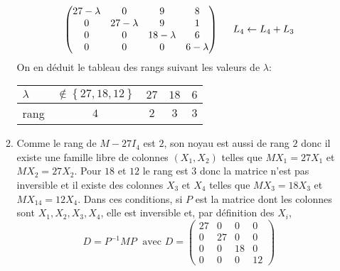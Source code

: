 \begin{enumerate}
\begin{enumerate}
\begin{multline*}
\begin{pmatrix}
27 - \lambda & 0 & 9 & 8 \\ 0 & 27 - \lambda  & 9 & 1 \\
0 & 0 & 18 - \lambda & 6 \\ 0 & 0 & 0 & 6 - \lambda
\end{pmatrix}
\hspace{0.5cm} L_4 \leftarrow L_4 + L_3  \\
\end{multline*}
On en déduit le tableau des rangs suivant les valeurs de $\lambda$:
\begin{center}
\renewcommand{\arraystretch}{1.8}
\begin{tabular}{|l|c|c|c|c|} \hline
$\lambda$ & $\notin \left\lbrace 27, 18, 12\right\rbrace $ & $27$ & $18$ & $6$\\\hline
rang & $4$ & $2$ & $3$ & $3$ \\ \hline
\end{tabular}
\end{center}

  \item Comme le rang de $M-27 I_4$ est $2$, son noyau est aussi de rang $2$ donc il existe une famille libre de colonnes $(X_1,X_2)$ telles que $MX_1 = 27X_1$ et $MX_2=27X_2$. Pour $18$ et $12$ le rang est $3$ donc la matrice n'est pas inversible et il existe des colonnes $X_3$ et $X_4$ telles que $MX_3=18X_3$ et $MX_14=12X_4$.\newline
  Dans ces conditions, si $P$ est la matrice dont les colonnes sont $X_1,X_2,X_3,X_4$, elle est inversible et, par définition des $X_i$, 
  \begin{displaymath}
    D = P^{-1} M P\;\text{ avec }
D = 
\begin{pmatrix}
  27 & 0 & 0 & 0 \\ 0 & 27 & 0 & 0 \\ 0 & 0 & 18 & 0 \\ 0 & 0 & 0 & 12
\end{pmatrix}
  \end{displaymath}
\end{enumerate}


\end{enumerate}
